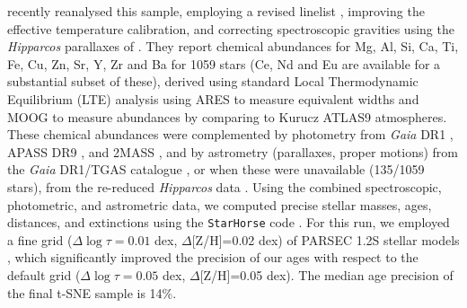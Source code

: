 \documentclass{aa}  %
\begin{document}
\citet{DelgadoMena2017} recently reanalysed this sample, employing a revised linelist \citep{Tsantaki2013}, improving the effective temperature calibration, and correcting spectroscopic gravities using the {\it Hipparcos} parallaxes of \citet{vanLeeuwen2007}. They report chemical abundances for Mg, Al, Si, Ca, Ti, Fe, Cu, Zn, Sr, Y, Zr and Ba for 1059 stars (Ce, Nd and Eu are available for a substantial subset of these), derived using standard Local Thermodynamic Equilibrium (LTE) analysis using ARES to measure equivalent widths and MOOG to measure abundances by comparing to Kurucz ATLAS9 atmospheres. These chemical abundances were complemented by photometry from {\it Gaia} DR1 \citep{GaiaCollaboration2016}, APASS DR9 \citep{Henden2014}, and 2MASS \citep{Cutri2003}, and by astrometry (parallaxes, proper motions) from the {\it Gaia} DR1/TGAS catalogue \citep{Michalik2015, GaiaCollaboration2016}, or when these were unavailable (135/1059 stars), from the re-reduced {\it Hipparcos} data \citep{vanLeeuwen2007}. Using the combined spectroscopic, photometric, and astrometric data, we computed precise stellar masses, ages, distances, and extinctions using the {\tt StarHorse} code \citep{Queiroz2018}. For this run, we employed a fine grid ($\Delta \log\tau=0.01$ dex, $\Delta$[Z/H]=0.02 dex) of PARSEC 1.2S stellar models \citep{Bressan2012, Tang2014, Chen2015}, which significantly improved the precision of our ages with respect to the default grid ($\Delta \log\tau=0.05$ dex, $\Delta$[Z/H]=0.05 dex). The median age precision of the final t-SNE sample is 14\%.
\end{document}
